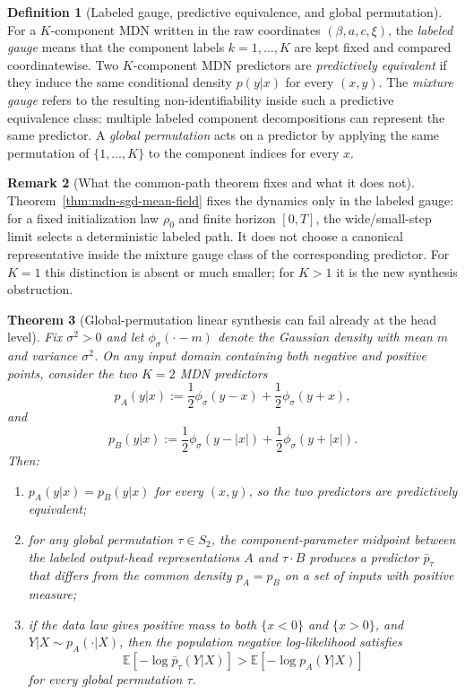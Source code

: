 \documentclass[11pt]{article}
\newtheorem{theorem}{Theorem}
\theoremstyle{definition}
\newtheorem{definition}[theorem]{Definition}
\newtheorem{remark}[theorem]{Remark}
\newcommand{\E}{\mathbb{E}}
\begin{document}
\begin{definition}[Labeled gauge, predictive equivalence, and global permutation]
For a $K$-component MDN written in the raw coordinates
$(\beta,a,c,\xi)$, the \emph{labeled gauge} means that the component labels
$k=1,\dots,K$ are kept fixed and compared coordinatewise. Two $K$-component
MDN predictors are \emph{predictively equivalent} if they induce the same
conditional density $p(y|x)$ for every $(x,y)$. The \emph{mixture gauge}
refers to the resulting non-identifiability inside such a predictive
equivalence class: multiple labeled component decompositions can represent the
same predictor. A \emph{global permutation} acts on a predictor by applying the
same permutation of $\{1,\dots,K\}$ to the component indices for every $x$.
\end{definition}

\begin{remark}[What the common-path theorem fixes and what it does not]
Theorem~\ref{thm:mdn-sgd-mean-field} fixes the dynamics only in the labeled
gauge: for a fixed initialization law $\rho_0$ and finite horizon $[0,T]$, the
wide/small-step limit selects a deterministic labeled path. It does not choose
a canonical representative inside the mixture gauge class of the corresponding
predictor. For $K=1$ this distinction is absent or much smaller; for $K>1$ it
is the new synthesis obstruction.
\end{remark}

\begin{theorem}[Global-permutation linear synthesis can fail already at the head level]
\label{thm:mdn-obstruction}
Fix $\sigma^2>0$ and let $\phi_\sigma(\cdot-m)$ denote the Gaussian density
with mean $m$ and variance $\sigma^2$. On any input domain containing both
negative and positive points, consider the two $K=2$ MDN predictors
\[
  p_A(y|x)
  :=
  \frac12 \phi_\sigma(y-x)+\frac12 \phi_\sigma(y+x),
\]
and
\[
  p_B(y|x)
  :=
  \frac12 \phi_\sigma(y-|x|)+\frac12 \phi_\sigma(y+|x|).
\]
Then:
\begin{enumerate}[label=(\roman*)]
  \item $p_A(y|x)=p_B(y|x)$ for every $(x,y)$, so the two predictors are
  predictively equivalent;
  \item for any global permutation $\tau\in S_2$, the component-parameter
  midpoint between the labeled output-head representations $A$ and $\tau\cdot B$
  produces a predictor $\bar p_\tau$ that differs from the common density
  $p_A=p_B$ on a set of inputs with positive measure;
  \item if the data law gives positive mass to both $\{x<0\}$ and $\{x>0\}$,
  and $Y|X\sim p_A(\cdot|X)$, then the population negative log-likelihood
  satisfies
  \[
    \E[-\log \bar p_\tau(Y|X)]
    >
    \E[-\log p_A(Y|X)]
  \]
  for every global permutation $\tau$.
\end{enumerate}
\end{theorem}
\end{document}
